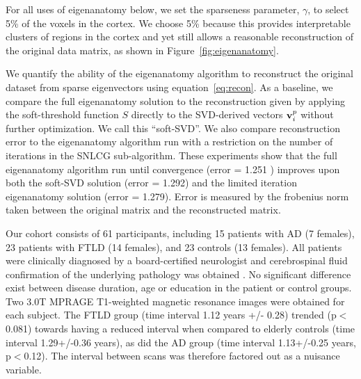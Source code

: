 \documentclass{llncs}
\newcommand{\vv}{{\bf v}}
\begin{document}
\newline

 \newline \newline
For all uses of eigenanatomy below, we set the sparseness parameter, $\gamma$, to select 5\% of the voxels in the cortex.  We choose 5\% because this provides interpretable clusters of regions in the cortex and yet still allows a reasonable reconstruction of the original data matrix, as shown in Figure~\ref{fig:eigenanatomy}. \newline

 We quantify the ability of the eigenanatomy algorithm to reconstruct the original dataset from sparse eigenvectors using equation~\ref{eq:recon}.  As a baseline, we compare the full eigenanatomy solution to the reconstruction given by applying the soft-threshold function $S$ directly to the SVD-derived vectors $\vv_i^p$ without further optimization.  We call this ``soft-SVD''.  We also compare reconstruction error to the eigenanatomy algorithm run with a restriction on the number of iterations in the SNLCG sub-algorithm.  These experiments show that the full eigenanatomy algorithm run until convergence (error = 1.251 ) improves upon both the soft-SVD solution (error = 1.292) and the limited iteration eigenanatomy solution (error = 1.279). Error is measured by the frobenius norm taken between the original matrix and the reconstructed matrix.\newline

 Our cohort consists of 61 participants, including 15 patients with AD (7 females), 23 patients with FTLD (14 females), and 23 controls (13 females). All patients were clinically diagnosed by a board-certified neurologist and cerebrospinal fluid confirmation of the underlying pathology was obtained \cite{Irwin2011}.  No significant difference exist between disease
duration, age or education in the patient or control groups.  Two 3.0T MPRAGE T1-weighted magnetic resonance images were obtained for each subject.  The FTLD group (time interval 1.12 years +/- 0.28) trended (p$<$0.081) towards having a reduced interval when compared to elderly controls (time interval 1.29+/-0.36 years), as did the AD group (time interval 1.13+/-0.25 years, p$<$0.12). The interval between scans was therefore factored out as a nuisance variable.

\end{document}
